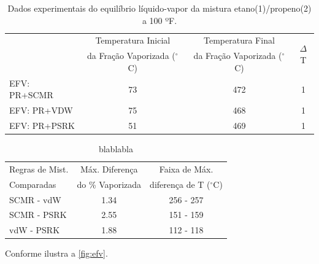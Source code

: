 \begin{table}[htb]
\renewcommand{\arraystretch}{1.3}
\caption{Dados experimentais do equilíbrio líquido-vapor da mistura
etano(1)/propeno(2) a 100 ºF.}
\footnotesize
\center 
\begin{tabular}{lccc}   
\toprule
   &{Temperatura Inicial}&{Temperatura Final}&\multirow{2}{*}{$\Delta$T} \\
  &{da Fração Vaporizada ($^\circ$C)}&{da Fração Vaporizada
   ($^\circ$C)} & \\
\midrule 
{EFV: PR+SCMR}	&	73	&	472		&	1 \\
{EFV: PR+VDW}	&	75	&	468		&	1 \\
{EFV: PR+PSRK}	&	51	&	469		&	1 \\
\bottomrule
\end{tabular}
\label{tab:result1}
\end{table}
\clearpage 

\begin{table}[htb]
\renewcommand{\arraystretch}{1.3}
\caption{blablabla}
\footnotesize
\center 
\begin{tabular}{lcc}   
\toprule
  {Regras de Mist.} &{Máx. Diferença}&{Faixa de Máx.} \\
   {Comparadas}&{do \% Vaporizada}&{diferença de T ($^\circ$C)} \\
\midrule 
{SCMR - vdW}	&	1.34	&	{256 - 257}	 \\
{SCMR - PSRK}	&	2.55	&	{151 - 159}	 \\
{vdW - PSRK}	&	1.88	&	{112 - 118}	 \\
\bottomrule
\end{tabular}
\label{tab:result2}
\end{table}
\clearpage



Conforme ilustra a \autoref{fig:efv}.

